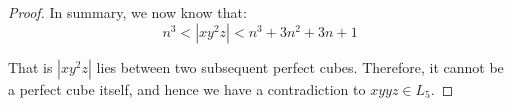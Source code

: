\begin{enumerate}
\begin{proof}
	In summary, we now know that:
	\[
		n^3 < | xy^2z | < n^3 + 3n^2 + 3n + 1
	\]
	
	That is \( | xy^2z | \) lies between two subsequent perfect cubes.  Therefore, it cannot be a perfect cube itself, and hence we have a contradiction to \( xyyz \in L_5 \).
	\end{proof}
\end{enumerate}



